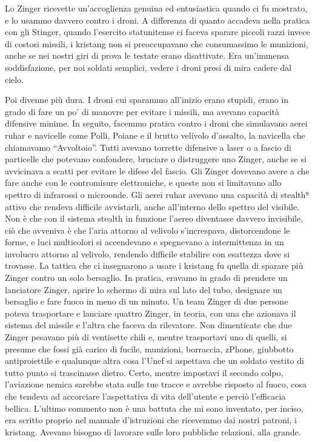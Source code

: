 Lo Zinger ricevette un'accoglienza genuina ed entusiastica quando ci fu
mostrato, e lo usammo davvero contro i droni. A differenza di quanto
accadeva nella pratica con gli Stinger, quando l'esercito statunitense
ci faceva sparare piccoli razzi invece di costosi missili, i kristang
non si preoccupavano che consumassimo le munizioni, anche se nei nostri
giri di prova le testate erano disattivate. Era un'immensa
soddisfazione, per noi soldati semplici, vedere i droni presi di mira
cadere dal cielo.

Poi divenne più dura. I droni cui sparammo all'inizio erano stupidi,
erano in grado di fare un po' di manovre per evitare i missili, ma
avevano capacità difensive minime. In seguito, facemmo pratica contro i
droni che simulavano aerei ruhar e navicelle come Polli, Poiane e il
brutto velivolo d'assalto, la navicella che chiamavamo ``Avvoltoio''.
Tutti avevano torrette difensive a laser o a fascio di particelle che
potevano confondere, bruciare o distruggere uno Zinger, anche se si
avvicinava a scatti per evitare le difese del fascio. Gli Zinger
dovevano avere a che fare anche con le contromisure elettroniche, e
queste non si limitavano allo spettro di infrarossi o microonde. Gli
aerei ruhar avevano una capacità di stealth⁹ attivo che rendeva
difficile avvistarli, anche all'interno dello spettro del visibile. Non
è che con il sistema stealth in funzione l'aereo diventasse davvero
invisibile, ciò che avveniva è che l'aria attorno al velivolo
s'increspava, distorcendone le forme, e luci multicolori si accendevano
e spegnevano a intermittenza in un involucro attorno al velivolo,
rendendo difficile stabilire con esattezza dove si trovasse. La tattica
che ci insegnarono a usare i kristang fu quella di sparare più Zinger
contro un solo bersaglio. In pratica, eravamo in grado di prendere un
lanciatore Zinger, aprire lo schermo di mira sul lato del tubo,
designare un bersaglio e fare fuoco in meno di un minuto. Un team Zinger
di due persone poteva trasportare e lanciare quattro Zinger, in teoria,
con una che azionava il sistema del missile e l'altra che faceva da
rilevatore. Non dimenticate che due Zinger pesavano più di ventisette
chili e, mentre trasportavi uno di quelli, si presume che fossi già
carico di fucile, munizioni, borraccia, zPhone, giubbotto antiproiettile
e qualunque altra cosa l'Unef si aspettava che un soldato vestito di
tutto punto si trascinasse dietro. Certo, mentre impostavi il secondo
colpo, l'aviazione nemica sarebbe stata sulle tue tracce e avrebbe
risposto al fuoco, cosa che tendeva ad accorciare l'aspettativa di vita
dell'utente e perciò l'efficacia bellica. L'ultimo commento non è una
battuta che mi sono inventato, per inciso, era scritto proprio nel
manuale d'istruzioni che ricevemmo dai nostri patroni, i kristang.
Avevano bisogno di lavorare sulle loro pubbliche relazioni, alla grande.

